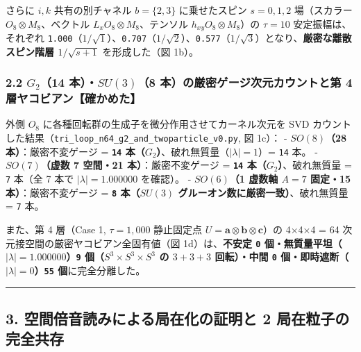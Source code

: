 \documentclass[
  a4paper,
]{ltjsarticle}
\begin{document}
さらに \(i, k\) 共有の別チャネル \(b = \{2, 3\}\) に乗せたスピン
\(s = 0, 1, 2\) 場（スカラー \(O_8\otimes M_8\)、ベクトル
\(L_x O_8\otimes M_8\)、テンソル \(h_{xy} O_8\otimes M_8\)）の
\(\tau = 10\) 安定振幅は、それぞれ
\texttt{1.000}（\(1/\sqrt{1}\)）、\texttt{0.707}（\(1/\sqrt{2}\)）、\texttt{0.577}（\(1/\sqrt{3}\)）となり、\textbf{厳密な離散スピン階層
\(1/\sqrt{s+1}\)} を形成した（図 1b）。

\subsubsection{\texorpdfstring{2.2 \(G_2\)（14 本）・\(SU(3)\)（8
本）の厳密ゲージ次元カウントと第 4
層ヤコビアン【確かめた】}{2.2 G\_2（14 本）・SU(3)（8 本）の厳密ゲージ次元カウントと第 4 層ヤコビアン【確かめた】}}\label{g_214-ux672csu38-ux672cux306eux53b3ux5bc6ux30b2ux30fcux30b8ux6b21ux5143ux30abux30a6ux30f3ux30c8ux3068ux7b2c-4-ux5c64ux30e4ux30b3ux30d3ux30a2ux30f3ux78baux304bux3081ux305f}

外側 \(O_8\) に各種回転群の生成子を微分作用させてカーネル次元を SVD
カウントした結果（\texttt{tri\_\allowbreak{}loop\_\allowbreak{}n64\_\allowbreak{}g2\_\allowbreak{}and\_\allowbreak{}twoparticle\_\allowbreak{}v0.py},
図 1c）： - \textbf{\(SO(8)\)（28 本）}：厳密不変ゲージ =
\textbf{\texttt{14} 本（\(G_2\)）}、破れ無質量（\(|\lambda|=1\)）=
\texttt{14} 本。 - \textbf{\(SO(7)\)（虚数 7 空間・21
本）}：厳密不変ゲージ = \textbf{\texttt{14} 本（\(G_2\)）}、破れ無質量 =
\texttt{7} 本（全 7 本で \(|\lambda| = 1.000000\) を確認）。 -
\textbf{\(SO(6)\)（1 虚数軸 \(A=7\) 固定・15 本）}：厳密不変ゲージ =
\textbf{\texttt{8} 本（\(SU(3)\) グルーオン数に厳密一致）}、破れ無質量 =
\texttt{7} 本。

また、第 4 層（Case 1, \(\tau = 1,000\) 静止固定点
\(U = \mathbf{a}\otimes\mathbf{b}\otimes\mathbf{c}\)）の 4×4×4 = 64
次元接空間の厳密ヤコビアン全固有値（図 1d）は、\textbf{不安定 \texttt{0}
個・無質量平坦（\(|\lambda| = 1.000000\)）\texttt{9}
個（\(S^3\times S^3\times S^3\) の \(3+3+3\) 回転）・中間 \texttt{0}
個・即時遮断（\(|\lambda| = 0\)）\texttt{55} 個}に完全分離した。

\begin{center}\rule{0.5\linewidth}{0.5pt}\end{center}

\subsection{3. 空間倍音読みによる局在化の証明と 2
局在粒子の完全共存}\label{ux7a7aux9593ux500dux97f3ux8aadux307fux306bux3088ux308bux5c40ux5728ux5316ux306eux8a3cux660eux3068-2-ux5c40ux5728ux7c92ux5b50ux306eux5b8cux5168ux5171ux5b58}
\end{document}
